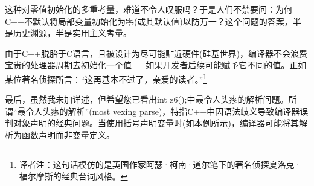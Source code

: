 这种对零值初始化的多重考量，难道不令人叹服吗？于是人们不禁要问：为何C++不默认将局部变量初始化为零(或其默认值)以防万一？这个问题的答案，半是历史渊源，半是实用主义考量。

由于C++脱胎于C语言，且被设计为尽可能贴近硬件(硅基世界)，编译器不会浪费宝贵的处理器周期去初始化一个值 --- 如果开发者后续可能赋予它不同的值。正如某位著名侦探所言：“这再基本不过了，亲爱的读者。”\footnote{译者注：这句话模仿的是英国作家阿瑟·柯南·道尔笔下的著名侦探夏洛克·福尔摩斯的经典台词风格。}

最后，虽然我未加详述，但希望您已看出int z6();中最令人头疼的解析问题。所谓“最令人头疼的解析”(most vexing parse)，特指C++中因语法歧义导致编译器误判对象声明的经典问题。当使用括号声明变量时(如本例所示)，编译器可能将其解析为函数声明而非变量定义。












